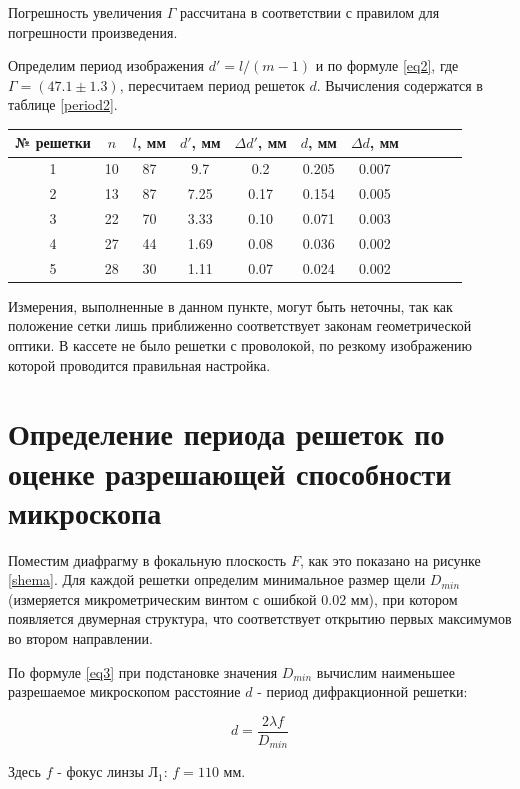 \documentclass[a4paper,12pt]{article}
\begin{document}
Погрешность увеличения $\Gamma$ рассчитана в соответствии с правилом для погрешности произведения. 

Определим период изображения $d' = l/(m-1)$ и по формуле \eqref{eq2}, где $\Gamma = (47.1 \pm 1.3)$, пересчитаем период решеток $d$. Вычисления содержатся в таблице \ref{period2}.

\begin{center}
	\begin{tabular}{|c|c|c|c|c|c|c|c|c|c|c|}
		\hline
		№ решетки&$n$ &$l$, мм&$d'$, мм&$\Delta d'$, мм&$d$, мм&$\Delta d$, мм\\
		\hline
		1&10&87&9.7&0.2&0.205&0.007\\
		\hline
		2&13&87&7.25&0.17&0.154&0.005\\
		\hline
		3&22&70&3.33&0.10&0.071&0.003\\
		\hline
		4&27&44&1.69&0.08&0.036&0.002\\
		\hline
		5&28&30&1.11&0.07&0.024&0.002\\
		\hline
	\end{tabular}
	\label{period2}
\end{center}	

Измерения, выполненные в данном пункте, могут быть неточны, так как положение сетки лишь приближенно соответствует законам геометрической оптики. В кассете не было решетки с проволокой, по резкому изображению которой проводится правильная настройка. 


\section*{Определение периода решеток по оценке разрешающей способности микроскопа}

Поместим диафрагму в фокальную плоскость $F$, как это показано на рисунке \ref{shema}. Для каждой решетки определим минимальное размер щели $D_{min}$ (измеряется микрометрическим винтом с ошибкой 0.02 мм), при котором появляется двумерная структура, что соответствует открытию первых максимумов во втором направлении. 

По формуле \eqref{eq3} при подстановке значения $D_{min}$ вычислим наименьшее разрешаемое микроскопом расстояние $d$ - период дифракционной решетки: 

\[ d = \frac{2\lambda f}{D_{min}} \]

Здесь $f$ - фокус линзы $\text{Л}_1$: $f = 110$ мм.  
\end{document}
